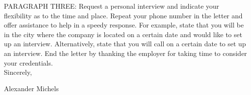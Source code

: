 \documentclass[12pt,fleqn,notitlepage,minimal]{article} %
\begin{document}
PARAGRAPH THREE: Request a personal interview and indicate your flexibility as to the time and place. Repeat your phone number in the letter and offer assistance to help in a speedy response. For example, state that you will be in the city where the company is located on a certain date and would like to set up an interview. Alternatively, state that you will call on a certain date to set up an interview. End the letter by thanking the employer for taking time to consider your credentials.  \\

Sincerely,

\noindent Alexander Michels
\end{document}
